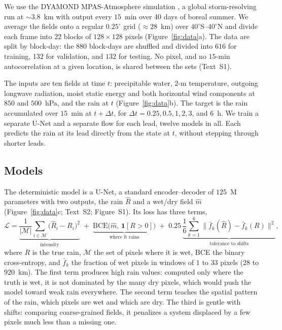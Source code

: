 \documentclass[draft]{agujournal2019}
\begin{document}
We use the DYAMOND MPAS-Atmosphere simulation \cite{stevens2019}, a global
storm-resolving run at ${\sim}3.8$~km with output every $15$~min over
40 days of boreal summer.
We average the fields onto a regular $0.25^{\circ}$ grid
(${\approx}28$~km) over $40^{\circ}$S--$40^{\circ}$N and divide each frame
into $22$ blocks of $128 \times 128$ pixels (Figure~\ref{fig:data}a). The
data are split by block-day: the $880$ block-days are shuffled and divided
into $616$ for training, $132$ for validation, and $132$ for testing. No
pixel, and no $15$-min autocorrelation at a given location, is shared
between the sets (Text~S1).

The inputs are ten fields at time $t$: precipitable water, 2-m
temperature, outgoing longwave radiation, moist static energy and both
horizontal wind components at $850$ and $500$~hPa, and the rain at $t$
(Figure~\ref{fig:data}b). The target is the rain accumulated over $15$~min
at $t + \Delta t$, for $\Delta t = 0.25, 0.5, 1, 2, 3$, and $6$~h. We
train a separate U-Net and a separate flow for each lead, twelve models
in all. Each predicts the rain at its lead directly from the state at $t$,
without stepping through shorter leads.

\subsection{Models}\label{sec:unet}

The deterministic model is a U-Net, a standard encoder--decoder of
$125$~M parameters with two outputs, the rain $\hat{R}$ and a wet/dry
field $\hat{m}$ (Figure~\ref{fig:data}c; Text~S2; Figure~S1). Its loss has three
terms,
\begin{equation}
\mathcal{L} =
\underbrace{\frac{1}{|\mathcal{M}|}\sum_{i \in \mathcal{M}}
  \big(\hat{R}_i - R_i\big)^2}_{\text{intensity}}
\;+\;
\underbrace{\mathrm{BCE}\big(\hat{m},\, \mathbf{1}[R > 0]\big)}_{\text{where it rains}}
\;+\; 0.25\,
\underbrace{\frac{1}{6}\sum_{k=1}^{6}
  \big\| \bar{f}_k(\hat{R}) - \bar{f}_k(R) \big\|^2}_{\text{tolerance to shifts}} ,
\label{eq:loss}
\end{equation}
where $R$ is the true rain, $\mathcal{M}$ the set of pixels where it is
wet, BCE the binary cross-entropy, and $\bar{f}_k$ the fraction of wet
pixels in windows of $1$ to $33$ pixels ($28$ to $920$~km). The first
term produces high rain values: computed only where the truth is wet, it
is not dominated by the many dry pixels, which would push the model toward
weak rain everywhere. The second term teaches the spatial pattern of the
rain, which pixels are wet and which are dry. The third is gentle with
shifts: comparing coarse-grained fields, it penalizes a system displaced
by a few pixels much less than a missing one.
\end{document}
